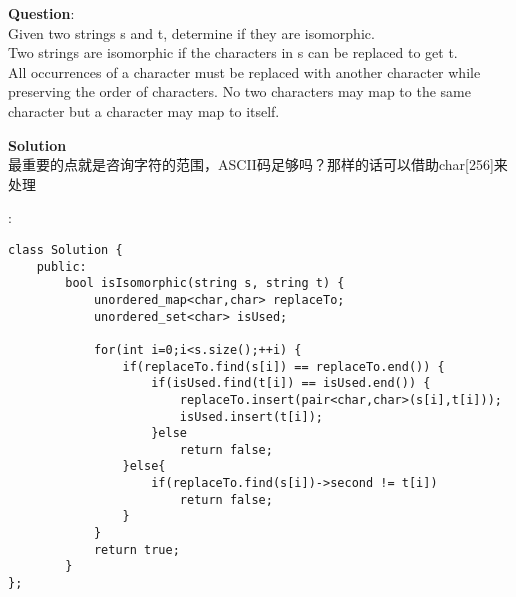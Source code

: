     
\begin{description}
    \item{\textbf{Question}}:\\%
		Given two strings s and t, determine if they are isomorphic.\\
		Two strings are isomorphic if the characters in s can be replaced to get t.\\
		All occurrences of a character must be replaced with another character while preserving the order of characters. No two characters may map to the same character but a character may map to itself.\\

    \item{\textbf{Solution}}\\
		最重要的点就是咨询字符的范围，ASCII码足够吗？那样的话可以借助char[256]来处理


	\item{} : \\
		\begin{lstlisting}
class Solution {
	public:
		bool isIsomorphic(string s, string t) {
			unordered_map<char,char> replaceTo;
			unordered_set<char> isUsed;

			for(int i=0;i<s.size();++i) {
				if(replaceTo.find(s[i]) == replaceTo.end()) {
					if(isUsed.find(t[i]) == isUsed.end()) {
						replaceTo.insert(pair<char,char>(s[i],t[i]));
						isUsed.insert(t[i]);
					}else
						return false;
				}else{
					if(replaceTo.find(s[i])->second != t[i])
						return false;
				}
			}
			return true;
		}
};
	\end{lstlisting}

\end{description}

